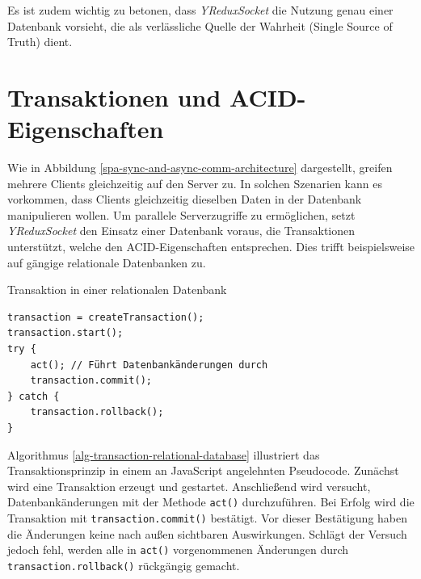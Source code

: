 \documentclass[12pt]{book}          %
\begin{document}
Es ist zudem wichtig zu betonen, dass \textit{YReduxSocket} die Nutzung genau einer Datenbank vorsieht, die als verlässliche Quelle der Wahrheit (Single Source of Truth) dient.

\section{Transaktionen und ACID-Eigenschaften}
\label{sec-acid-prinzipien}

Wie in Abbildung \ref{spa-sync-and-async-comm-architecture} dargestellt, greifen mehrere Clients gleichzeitig auf den Server zu. In solchen Szenarien kann es vorkommen, dass Clients gleichzeitig dieselben Daten in der Datenbank manipulieren wollen. Um parallele Serverzugriffe zu ermöglichen, setzt \textit{YReduxSocket} den Einsatz einer Datenbank voraus, die Transaktionen unterstützt, welche den ACID-Eigenschaften entsprechen. Dies trifft beispielsweise auf gängige relationale Datenbanken zu.

\begin{algorithm}
\caption{Transaktion in einer relationalen Datenbank}
\label{alg-transaction-relational-database}
\begin{lstlisting}
transaction = createTransaction();
transaction.start();
try {
    act(); // Führt Datenbankänderungen durch
    transaction.commit();
} catch {
    transaction.rollback();
}
\end{lstlisting}
\end{algorithm}

Algorithmus \ref{alg-transaction-relational-database} illustriert das Transaktionsprinzip in einem an JavaScript angelehnten Pseudocode. Zunächst wird eine Transaktion erzeugt und gestartet. Anschließend wird versucht, Datenbankänderungen mit der Methode \texttt{act()} durchzuführen. Bei Erfolg wird die Transaktion mit \texttt{transaction.commit()} bestätigt. Vor dieser Bestätigung haben die Änderungen keine nach außen sichtbaren Auswirkungen. Schlägt der Versuch jedoch fehl, werden alle in \texttt{act()} vorgenommenen Änderungen durch \texttt{transaction.rollback()} rückgängig gemacht.
\end{document}
